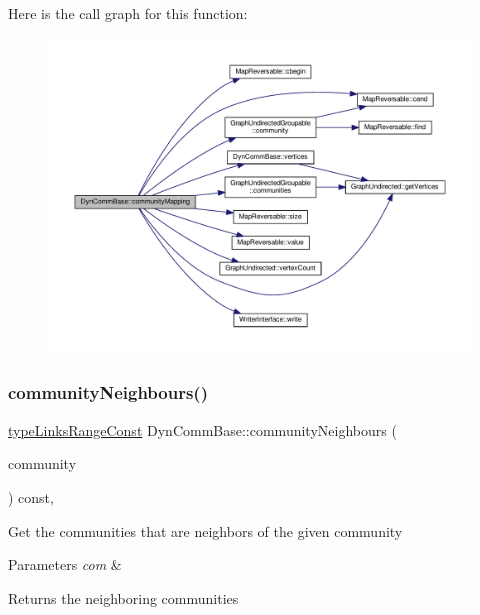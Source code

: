 Here is the call graph for this function\+:
\nopagebreak
\begin{figure}[H]
\begin{center}
\leavevmode
\includegraphics[width=350pt]{classDynCommBase_a75ed5e0546d756a3b327f41e292620b2_cgraph}
\end{center}
\end{figure}
\mbox{\label{classDynCommBase_aba6f1f0fdd67a1d7f546d63706a60cde}} 
\subsubsection{\texorpdfstring{community\+Neighbours()}{communityNeighbours()}}
{\footnotesize\ttfamily \hyperlink{graphInterface_8h_ae8d27008f15586bbf419af7ad2e0a48a}{type\+Links\+Range\+Const} Dyn\+Comm\+Base\+::community\+Neighbours (\begin{DoxyParamCaption}\item[{\hyperlink{graphUndirectedGroupable_8h_a914da95c9ea7f14f4b7f875c36818556}{type\+Community}}]{community }\end{DoxyParamCaption}) const\hspace{0.3cm}{\ttfamily [inline]}, {\ttfamily [virtual]}}

Get the communities that are neighbors of the given community


\begin{DoxyParams}{Parameters}
{\em com} & \\
\hline
\end{DoxyParams}
\begin{DoxyReturn}{Returns}
the neighboring communities 
\end{DoxyReturn}


